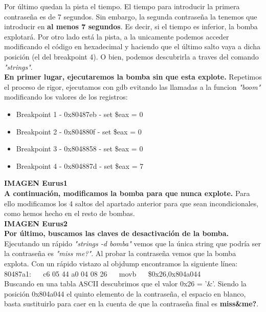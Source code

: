 \documentclass[11pt,a4paper]{article}
\begin{document}
Por último quedan la pista el tiempo. El tiempo para introducir la primera contraseña es de 7 segundos. Sin embargo, la segunda contraseña la tenemos que introducir en \textbf{al menos 7 segundos}. Es decir, si el tiempo es inferior, la bomba explotará. Por otro lado está la pista, a la unicamente podemos acceder modificando el código en hexadecimal y haciendo que el último salto vaya a dicha posición (el del breakpoint 4). O bien, podemos descubrirla a traves del comando \emph{"strings"}. \\

\textbf{En primer lugar, ejecutaremos la bomba sin que esta explote.} Repetimos el proceso de rigor, ejecutamos con gdb evitando las llamadas a la funcion \emph{"boom"} modificando los valores de los registros: 

\begin{itemize}
	\item Breakpoint 1 - 0x80487eb - set \$eax = 0
	\item Breakpoint 2 - 0x804880f - set \$eax = 0
	\item Breakpoint 3 - 0x8048858 - set \$eax = 0
	\item Breakpoint 4 - 0x804887d - set \$eax = 7
\end{itemize}

\textbf{IMAGEN Eurus1} \\

\textbf{A continuación, modificamos la bomba para que nunca explote.} Para ello modificamos los 4 saltos del apartado anterior para que sean incondicionales, como hemos hecho en el resto de bombas. \\

\textbf{IMAGEN Eurus2} \\

\textbf{Por último, buscamos las claves de desactivación de la bomba.} Ejecutando un rápido \emph{"strings -d bomba"} vemos que la única string que podría ser la contraseña es \emph{"miss me?"}. Al probar la contraseña vemos que la bomba explota. Con un rápido vistazo al objdump encontramos la siguiente línea: \\

 80487a1: $\quad$ c6 05 44 a0 04 08 26 $\quad$ movb $\quad$ \$0x26,0x804a044 \\

Buscando en una tabla 	ASCII descubrimos que el valor 0x26 = '\&'. Siendo la posición 0x804a044 el quinto elemento de la contraseña, el espacio en blanco, basta sustituirlo para caer en la cuenta de que la contraseña final es \textbf{miss\&me?}. \\
\end{document}
